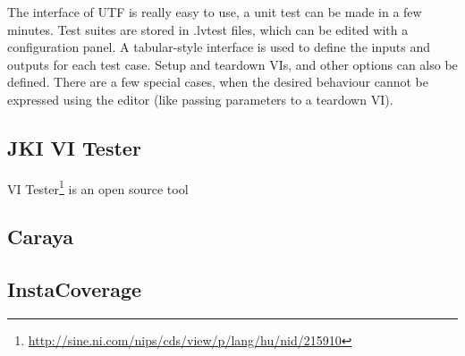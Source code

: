 The interface of UTF is really easy to use, a unit test can be made in a few minutes. Test suites are stored in .lvtest files, which can be edited with a configuration panel. A tabular-style interface is used to define the inputs and outputs for each test case. Setup and teardown VIs, and other options can also be defined. There are a few special cases, when the desired behaviour cannot be expressed using the editor (like passing parameters to a teardown VI).
\subsection{JKI VI Tester}
VI Tester\footnote{\url{http://sine.ni.com/nips/cds/view/p/lang/hu/nid/215910}} is an open source tool
\subsection{Caraya}
\subsection{InstaCoverage}